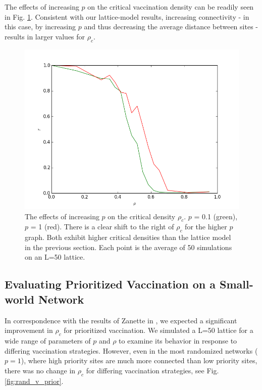 \documentclass{article}
\begin{document}
The effects of increasing $p$ on the critical vaccination density can be readily seen in Fig. \ref{fig:p_rho}. Consistent with our lattice-model results, increasing connectivity - in this case, by increasing $p$ and thus decreasing the average distance between sites - results in larger values for $\rho_c$.

\begin{figure}[h!]
\centering
\includegraphics[scale=0.5]{figs/rand_immune.png}
\caption{The effects of increasing $p$ on the critical density $\rho_c$. $p$ = 0.1 (green), $p$ = 1 (red). There is a clear shift to the right of $\rho_c$ for the higher $p$ graph. Both exhibit higher critical densities than the lattice model in the previous section. Each point is the average of 50 simulations on an L=50 lattice.}
\label{fig:p_rho}
\end{figure}

\subsection{Evaluating Prioritized Vaccination on a Small-world Network}

In correspondence with the results of Zanette in \cite{Zanette}, we expected a significant improvement in $\rho_c$ for prioritized vaccination. We simulated a L=50 lattice for a wide range of parameters of $p$ and $\rho$ to examine its behavior in response to differing vaccination strategies. However, even in the most randomized networks ($p=1$), where high priority sites are much more connected than low priority sites, there was no change in $\rho_c$ for differing vaccination strategies, see Fig. \ref{fig:rand_v_prior}.
\end{document}
